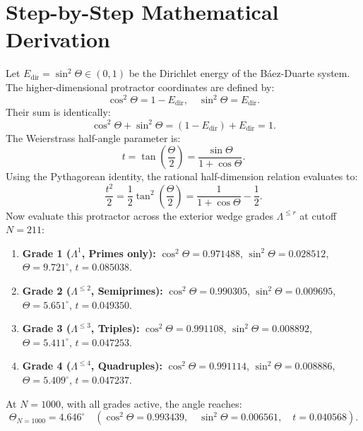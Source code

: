\documentclass[11pt,a4paper]{article}
\theoremstyle{definition}
\begin{document}
\section{Step-by-Step Mathematical Derivation}

Let $E_{\mathrm{dir}} = \sin^2\Theta \in (0, 1)$ be the Dirichlet energy of the Báez-Duarte system. The higher-dimensional protractor coordinates are defined by:
\begin{equation}
\cos^2\Theta = 1 - E_{\mathrm{dir}}, \quad \sin^2\Theta = E_{\mathrm{dir}}.
\end{equation}
Their sum is identically:
\begin{equation}
\cos^2\Theta + \sin^2\Theta = (1 - E_{\mathrm{dir}}) + E_{\mathrm{dir}} = 1.
\end{equation}
The Weierstrass half-angle parameter is:
\begin{equation}
t = \tan\left(\frac{\Theta}{2}\right) = \frac{\sin\Theta}{1 + \cos\Theta}.
\end{equation}
Using the Pythagorean identity, the rational half-dimension relation evaluates to:
\begin{equation}
\frac{t^2}{2} = \frac{1}{2} \tan^2\left(\frac{\Theta}{2}\right) = \frac{1}{1 + \cos\Theta} - \frac{1}{2}.
\end{equation}
Now evaluate this protractor across the exterior wedge grades $\Lambda^{\le r}$ at cutoff $N = 211$:
\begin{enumerate}
\item \textbf{Grade 1 ($\Lambda^1$, Primes only):} $\cos^2\Theta = 0.971488$, $\sin^2\Theta = 0.028512$, $\Theta = 9.721^\circ$, $t = 0.085038$.
\item \textbf{Grade 2 ($\Lambda^{\le 2}$, Semiprimes):} $\cos^2\Theta = 0.990305$, $\sin^2\Theta = 0.009695$, $\Theta = 5.651^\circ$, $t = 0.049350$.
\item \textbf{Grade 3 ($\Lambda^{\le 3}$, Triples):} $\cos^2\Theta = 0.991108$, $\sin^2\Theta = 0.008892$, $\Theta = 5.411^\circ$, $t = 0.047253$.
\item \textbf{Grade 4 ($\Lambda^{\le 4}$, Quadruples):} $\cos^2\Theta = 0.991114$, $\sin^2\Theta = 0.008886$, $\Theta = 5.409^\circ$, $t = 0.047237$.
\end{enumerate}
At $N = 1000$, with all grades active, the angle reaches:
\begin{equation}
\Theta_{N=1000} = 4.646^\circ \quad (\cos^2\Theta = 0.993439, \quad \sin^2\Theta = 0.006561, \quad t = 0.040568).
\end{equation}
\end{document}
